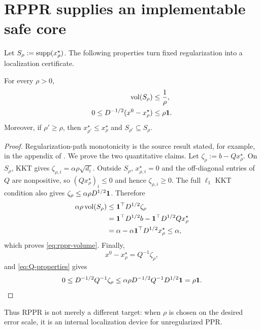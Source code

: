 \section{RPPR supplies an implementable safe core}
\label{sec:rppr-core}

Let $S_\rho:=\operatorname{supp}(x_\rho^\star)$.  The following properties turn fixed
regularization into a localization certificate.

\begin{theorem}
\label{thm:rppr-support}
For every $\rho>0$,
\begin{align}
  \operatorname{vol}(S_\rho)&\leq\frac1\rho,
  \label{eq:rppr-volume}\\
  0\leq D^{-1/2}(x^0-x_\rho^\star)&\leq\rho\mathbf{1}.
  \label{eq:rppr-ppr-error}
\end{align}
Moreover, if $\rho'\geq\rho$, then
$x_{\rho'}^\star\leq x_\rho^\star$ and
$S_{\rho'}\subseteq S_\rho$.
\end{theorem}

\begin{proof}
Regularization-path monotonicity is the source result stated, for example, in
the appendix of \citet{fountoulakis2026}.  We prove the two quantitative
claims.  Let $\zeta_\rho:=b-Qx_\rho^\star$.  On $S_\rho$, KKT gives
$\zeta_{\rho,i}=\alpha\rho\sqrt{d_i}$.  Outside $S_\rho$,
$x_{\rho,i}^\star=0$ and the off-diagonal entries of $Q$ are nonpositive, so
$(Qx_\rho^\star)_i\leq0$ and hence $\zeta_{\rho,i}\geq0$.  The full
$\ell_1$ KKT condition also gives
$\zeta_\rho\leq\alpha\rho D^{1/2}\mathbf{1}$.  Therefore
\begin{align*}
 \alpha\rho\operatorname{vol}(S_\rho)
 &\leq\mathbf{1}^\top D^{1/2}\zeta_\rho\\
 &=\mathbf{1}^\top D^{1/2}b
   -\mathbf{1}^\top D^{1/2}Qx_\rho^\star\\
 &=\alpha-\alpha\mathbf{1}^\top D^{1/2}x_\rho^\star
 \leq\alpha,
\end{align*}
which proves \cref{eq:rppr-volume}.  Finally,
\[
  x^0-x_\rho^\star=Q^{-1}\zeta_\rho,
\]
and \cref{eq:Q-properties} gives
\[
  0\leq D^{-1/2}Q^{-1}\zeta_\rho
  \leq\alpha\rho D^{-1/2}Q^{-1}D^{1/2}\mathbf{1}
  =\rho\mathbf{1}.
\]
\end{proof}

Thus RPPR is not merely a different target: when $\rho$ is chosen on the
desired error scale, it is an internal localization device for unregularized
PPR.
